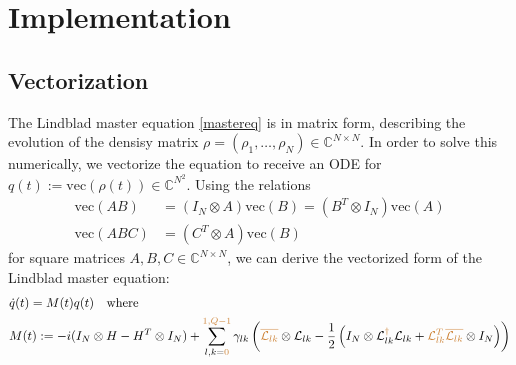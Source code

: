\documentclass[letterpaper]{article}
\newcommand{\YC}[1]{{\textcolor{Bronze}{#1}}}
\newcommand{\Ell}{\mathcal{L}}
\newcommand{\C}{\mathds{C}}
\begin{document}
\section{Implementation}

  \subsection{Vectorization}
  The Lindblad master equation \eqref{mastereq} is in matrix form, describing
  the evolution of the densisy matrix $\rho = (\rho_1, \dots, \rho_N) \in
  \C^{N\times N}$. In order to solve this numerically, we vectorize the equation
  to receive an ODE for $q(t) := \text{vec}(\rho(t)) \in \C^{N^2}$. Using the
  relations
  \begin{align}
   \text{vec}(AB) &= (I_N\otimes A)\text{vec}(B) = (B^T\otimes I_N)\text{vec}(A)
    \\
   \text{vec}(ABC) &= (C^T\otimes A)\text{vec}(B)
  \end{align}
  for square matrices $A,B,C\in\C^{N\times N}$, we can derive the vectorized
  form of the Lindblad master equation:
  \begin{align}\label{mastereq_vectorized}
    &\dot q(t) = M(t) q(t) \quad  \text{where} \\
    &M(t) := -i(I_N\otimes H - H^T \otimes I_N) + \sum_{l,k=\YC{0}}^{\YC{1,Q-1}} \gamma_{lk}
    \left( \YC{\overline{\Ell_{lk}}}\otimes \Ell_{lk} - \frac 1 2 \left( I_N\otimes
    \Ell^{\YC{\dagger}}_{lk}\Ell_{lk} + \YC{\Ell^T_{lk}\overline{\Ell_{lk}}} \otimes I_N \right) \right)
  \end{align}
\end{document}
